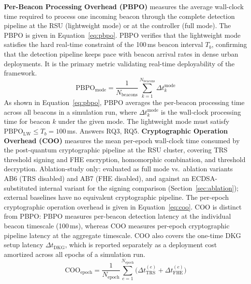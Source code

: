 \documentclass[12pt, a4paper]{report}
\begin{document}
\textbf{Per-Beacon Processing Overhead (PBPO)} measures the
average wall-clock time required to process one incoming beacon
through the complete detection pipeline at the RSU (lightweight
mode) or at the controller (full mode). The PBPO is given in
Equation~\ref{eq:pbpo}.
\newline
\newline
PBPO verifies that the lightweight mode satisfies the hard
real-time constraint of the 100\,ms beacon interval $T_b$,
confirming that the detection pipeline keeps pace with beacon
arrival rates in dense urban deployments. It is the primary
metric validating real-time deployability of the framework.
\begin{equation}
  \mathrm{PBPO}_{\mathrm{mode}} =
    \frac{1}{N_{\mathrm{beacons}}}
    \sum_{k=1}^{N_{\mathrm{beacons}}} \Delta t_k^{\mathrm{mode}}
  \label{eq:pbpo}
\end{equation}
As shown in Equation~\ref{eq:pbpo}, PBPO averages the per-beacon
processing time across all beacons in a simulation run, where
$\Delta t_k^{\mathrm{mode}}$ is the wall-clock processing time
for beacon $k$ under the given mode. The lightweight mode must
satisfy $\mathrm{PBPO}_{\mathrm{LW}} \leq T_b = 100$\,ms.
Answers RQ3, RQ5.
\newline
\newline
\textbf{Cryptographic Operation Overhead (COO)} measures the
mean per-epoch wall-clock time consumed by the post-quantum
cryptographic pipeline at the RSU cluster, covering TRS
threshold signing and FHE encryption, homomorphic combination,
and threshold decryption. Ablation-study only: evaluated as full mode
vs.\ ablation variants AB6 (TRS disabled) and AB7 (FHE disabled),
and against an ECDSA-substituted internal variant for the signing
comparison (Section~\ref{sec:ablation}); external baselines have
no equivalent cryptographic pipeline.
The per-epoch cryptographic operation overhead is given in
Equation~\ref{eq:coo}.
\newline
\newline
COO is distinct from PBPO: PBPO measures per-beacon detection
latency at the individual beacon timescale (100\,ms), whereas
COO measures per-epoch cryptographic pipeline latency at the
aggregate timescale. COO also covers the one-time DKG setup
latency $\Delta t_{\mathrm{DKG}}$, which is reported separately
as a deployment cost amortized across all epochs of a
simulation run.
\begin{equation}
  \mathrm{COO}_{\mathrm{epoch}} =
    \frac{1}{N_{\mathrm{epoch}}}
    \sum_{e=1}^{N_{\mathrm{epoch}}}
    \bigl(\Delta t_{\mathrm{TRS}}^{(e)}
    + \Delta t_{\mathrm{FHE}}^{(e)}\bigr)
  \label{eq:coo}
\end{equation}
\end{document}
